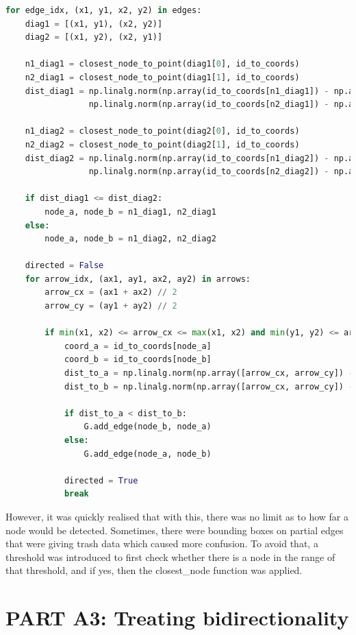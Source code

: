 \documentclass{article}
\begin{document}
\begin{lstlisting}[language=Python, caption=Edge finding]
for edge_idx, (x1, y1, x2, y2) in edges:
    diag1 = [(x1, y1), (x2, y2)]
    diag2 = [(x1, y2), (x2, y1)]

    n1_diag1 = closest_node_to_point(diag1[0], id_to_coords)
    n2_diag1 = closest_node_to_point(diag1[1], id_to_coords)
    dist_diag1 = np.linalg.norm(np.array(id_to_coords[n1_diag1]) - np.array(diag1[0])) + \
                 np.linalg.norm(np.array(id_to_coords[n2_diag1]) - np.array(diag1[1]))

    n1_diag2 = closest_node_to_point(diag2[0], id_to_coords)
    n2_diag2 = closest_node_to_point(diag2[1], id_to_coords)
    dist_diag2 = np.linalg.norm(np.array(id_to_coords[n1_diag2]) - np.array(diag2[0])) + \
                 np.linalg.norm(np.array(id_to_coords[n2_diag2]) - np.array(diag2[1]))

    if dist_diag1 <= dist_diag2:
        node_a, node_b = n1_diag1, n2_diag1
    else:
        node_a, node_b = n1_diag2, n2_diag2

    directed = False
    for arrow_idx, (ax1, ay1, ax2, ay2) in arrows:
        arrow_cx = (ax1 + ax2) // 2
        arrow_cy = (ay1 + ay2) // 2

        if min(x1, x2) <= arrow_cx <= max(x1, x2) and min(y1, y2) <= arrow_cy <= max(y1, y2):
            coord_a = id_to_coords[node_a]
            coord_b = id_to_coords[node_b]
            dist_to_a = np.linalg.norm(np.array([arrow_cx, arrow_cy]) - np.array(coord_a))
            dist_to_b = np.linalg.norm(np.array([arrow_cx, arrow_cy]) - np.array(coord_b))

            if dist_to_a < dist_to_b:
                G.add_edge(node_b, node_a)
            else:
                G.add_edge(node_a, node_b)

            directed = True
            break
\end{lstlisting}

However, it was quickly realised that with this, there was no limit as to how far a node would be detected. Sometimes, there were bounding boxes on partial edges that were giving trash data which caused more confusion. To avoid that, a threshold was introduced to first check whether there is a node in the range of that threshold, and if yes, then the closest\_node function was applied.

\section{PART A3: Treating bidirectionality}
\end{document}
